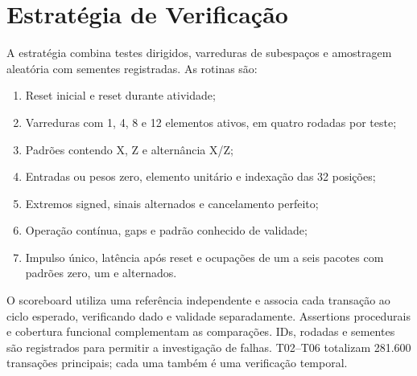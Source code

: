 \documentclass[12pt,a4paper]{article}
\begin{document}
\section{Estratégia de Verificação}
A estratégia combina testes dirigidos, varreduras de subespaços e amostragem aleatória com sementes registradas. As rotinas são:
\begin{enumerate}
\item Reset inicial e reset durante atividade;
\item Varreduras com 1, 4, 8 e 12 elementos ativos, em quatro rodadas por teste;
\item Padrões contendo X, Z e alternância X/Z;
\item Entradas ou pesos zero, elemento unitário e indexação das 32 posições;
\item Extremos signed, sinais alternados e cancelamento perfeito;
\item Operação contínua, gaps e padrão conhecido de validade;
\item Impulso único, latência após reset e ocupações de um a seis pacotes com padrões zero, um e alternados.
\end{enumerate}
O scoreboard utiliza uma referência independente e associa cada transação ao ciclo esperado, verificando dado e validade separadamente. Assertions procedurais e cobertura funcional complementam as comparações. IDs, rodadas e sementes são registrados para permitir a investigação de falhas. T02--T06 totalizam 281.600 transações principais; cada uma também é uma verificação temporal.
\end{document}
